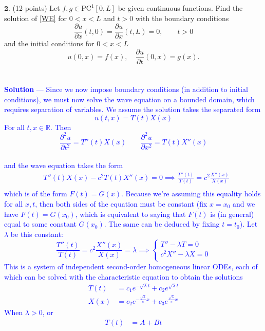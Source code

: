 \documentclass[12pt]{article}
\begin{document}
\vspace{0.2in}

\noindent $\textbf{2}$. (12 points) Let $f, g \in \mathrm{PC}^1[0,L]$ be given continuous functions. Find the solution of \eqref{WE}
for $0 < x < L$ and $t > 0$
with the boundary conditions
$$\frac{\partial u}{\partial x}(t,0) = \frac{\partial u}{\partial x}(t,L) =0 , \qquad t > 0$$
and the initial conditions for $0 < x < L$
$$ u(0,x) = f(x), \quad \frac{\partial u}{\partial t}(0,x) = g(x).$$ \\ \\
\textcolor{blue}{\textbf{Solution} — Since we now impose boundary conditions (in addition to initial conditions), we must now solve the wave equation on a bounded domain, which requires separation of variables. We assume the solution takes the separated form
$$u(t,x) = T(t)X(x)$$ For all $t,x \in \mathbb{R}$. Then $$\frac{\partial^2 u}{\partial t^2} = T''(t)X(x) \;\;\;\;\;\;\; \frac{\partial^2 u}{\partial x^2} = T(t)X''(x)$$ \\ and the wave equation takes the form \\
\begin{align*}
& T''(t)X(x) - c^2 T(t)X''(x) = 0 \implies \frac{T''(t)}{T(t)} = c^2 \frac{X''(x)}{X(x)} \\
\end{align*}
which is of the form $F(t) = G(x)$. Because we're assuming this equality holds for all $x,t$, then both sides of the equation must be constant (fix $x=x_0$ and we have $F(t) = G(x_0)$, which is equivalent to saying that $F(t)$ is (in general) equal to some constant $G(x_0)$. The same can be deduced by fixing $t=t_0$). Let $\lambda$ be this constant: $$\frac{T''(t)}{T(t)} = c^2 \frac{X''(x)}{X(x)} = \lambda \implies 
\begin{cases}
T'' - \lambda T = 0 \\
c^2X'' - \lambda X = 0 \\
\end{cases}$$
This is a system of independent second-order homogeneous linear ODEs, each of which can be solved with the characteristic equation to obtain the solutions \\ 
\begin{align*}
T(t) &= c_1 e^{-\sqrt{\lambda} t} + c_2 e^{\sqrt{\lambda}t} \\
X(x) &= c_2 e^{-\frac{\sqrt{\lambda}}{c} x} + c_3 e^{\frac{\sqrt{\lambda}}{c}x}
\end{align*}
When $\lambda > 0$, or
\begin{align*}
T(t) &= A + Bt \\

\end{align*}}
\end{document}
